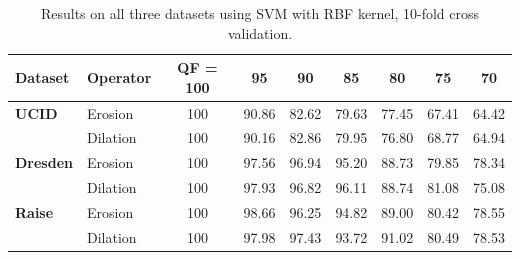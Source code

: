\documentclass[review]{elsarticle}
\begin{document}
\begin{table}
	\centering
	\caption{Results on all three datasets  using SVM with RBF kernel, 10-fold cross validation.}
	\label{table:detection_results}
	\begin{tabular}{l|l|ccccccc}
		\hline\hline
		\textbf{Dataset} & \textbf{Operator} & \textbf{QF = 100} & \textbf{95} & \textbf{90} & \textbf{85} & \textbf{80} & \textbf{75} & \textbf{70} \\
		\hline
		\textbf{UCID} & Erosion & 100 & 90.86 & 82.62 & 79.63 & 77.45 & 67.41 & 64.42 \\
		& Dilation & 100 & 90.16 & 82.86 & 79.95 & 76.80 & 68.77 & 64.94 \\
		\hline
		\textbf{Dresden} & Erosion & 100 & 97.56 & 96.94 & 95.20 & 88.73 & 79.85 & 78.34 \\
		& Dilation & 100 & 97.93 & 96.82 & 96.11 & 88.74 & 81.08 & 75.08 \\
		\hline
		\textbf{Raise} & Erosion & 100 & 98.66 & 96.25 & 94.82 & 89.00 & 80.42 & 78.55 \\
		& Dilation & 100 & 97.98 & 97.43 & 93.72 & 91.02 & 80.49 & 78.53 \\
		\hline\hline
	\end{tabular}
\end{table}
\end{document}
